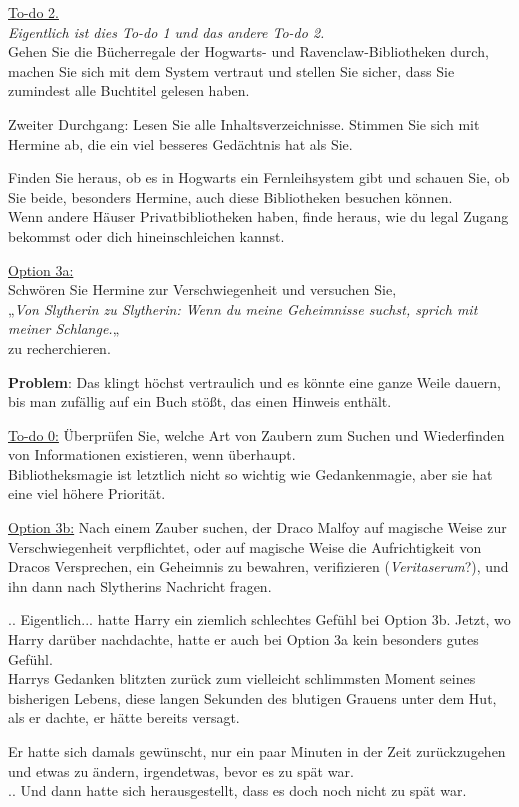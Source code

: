 {\uline{To-do 2.}\\ \emph{Eigentlich ist dies To-do 1 und das andere To-do 2.}\\ Gehen Sie die Bücherregale der Hogwarts- und Ravenclaw-Bibliotheken durch, machen Sie sich mit dem System vertraut und stellen Sie sicher, dass Sie zumindest alle Buchtitel gelesen haben.

Zweiter Durchgang: Lesen Sie alle Inhaltsverzeichnisse. Stimmen Sie sich mit Hermine ab, die ein viel besseres Gedächtnis hat als Sie.

Finden Sie heraus, ob es in Hogwarts ein Fernleihsystem gibt und schauen Sie, ob Sie beide, besonders Hermine, auch diese Bibliotheken besuchen können.\\ Wenn andere Häuser Privatbibliotheken haben, finde heraus, wie du legal Zugang bekommst oder dich hineinschleichen kannst.

\uline{Option 3a:}\\ Schwören Sie Hermine zur Verschwiegenheit und versuchen Sie,\\ „\emph{Von Slytherin zu Slytherin: Wenn du meine Geheimnisse suchst, sprich mit meiner Schlange.}„\\ zu recherchieren.

\textbf{Problem}: Das klingt höchst vertraulich und es könnte eine ganze Weile dauern, bis man zufällig auf ein Buch stößt, das einen Hinweis enthält.

\uline{To-do 0:} Überprüfen Sie, welche Art von Zaubern zum Suchen und Wiederfinden von Informationen existieren, wenn überhaupt.\\ Bibliotheksmagie ist letztlich nicht so wichtig wie Gedankenmagie, aber sie hat eine viel höhere Priorität.

\uline{Option 3b:} Nach einem Zauber suchen, der Draco Malfoy auf magische Weise zur Verschwiegenheit verpflichtet, oder auf magische Weise die Aufrichtigkeit von Dracos Versprechen, ein Geheimnis zu bewahren, verifizieren (\emph{Veritaserum}?), und ihn dann nach Slytherins Nachricht fragen.

.. Eigentlich... hatte Harry ein ziemlich schlechtes Gefühl bei Option 3b. Jetzt, wo Harry darüber nachdachte, hatte er auch bei Option 3a kein besonders gutes Gefühl.\\ Harrys Gedanken blitzten zurück zum vielleicht schlimmsten Moment seines bisherigen Lebens, diese langen Sekunden des blutigen Grauens unter dem Hut, als er dachte, er hätte bereits versagt.

Er hatte sich damals gewünscht, nur ein paar Minuten in der Zeit zurückzugehen und etwas zu ändern, irgendetwas, bevor es zu spät war.\\ .. Und dann hatte sich herausgestellt, dass es doch noch nicht zu spät war.

}
